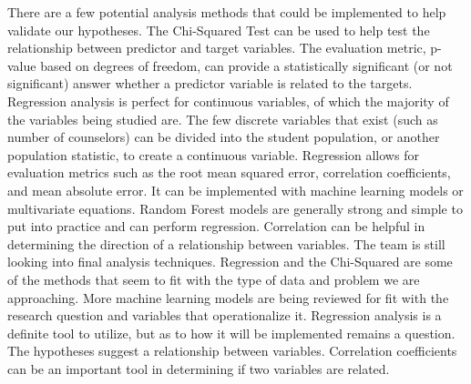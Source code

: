 There are a few potential analysis methods that could be implemented to help validate our hypotheses. The Chi-Squared Test can be used to help test the relationship between predictor and target variables. The evaluation metric, p-value based on degrees of freedom, can provide a statistically significant (or not significant) answer whether a predictor variable is related to the targets. 
Regression analysis is perfect for continuous variables, of which the majority of the variables being studied are. The few discrete variables that exist (such as number of counselors) can be divided into the student population, or another population statistic, to create a continuous variable. 
Regression allows for evaluation metrics such as the root mean squared error, correlation coefficients, and mean absolute error. 
It can be implemented with machine learning models or multivariate equations. 
Random Forest models are generally strong and simple to put into practice and can perform regression. Correlation can be helpful in determining the direction of a relationship between variables. 
The team is still looking into final analysis techniques. 
Regression and the Chi-Squared are some of the methods that seem to fit with the type of data and problem we are approaching. 
More machine learning models are being reviewed for fit with the research question and variables that operationalize it.
Regression analysis is a definite tool to utilize, but as to how it will be implemented remains a question. 
The hypotheses suggest a relationship between variables. 
Correlation coefficients can be an important tool in determining if two variables are related.